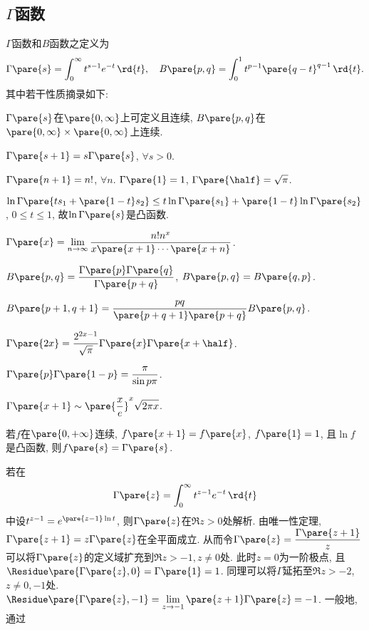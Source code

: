\documentclass{ctexart}
\begin{document}

\subsection{\texorpdfstring{$\Gamma$}{Gamma}函数} %
\label{sub:gamma函数}

$\Gamma$函数和$B$函数之定义为
\[ \Gamma\pare{s} = \int_0^\infty t^{s-1} e^{-t}\,\rd{t},\quad B\pare{p,q} = \int_0^1 t^{p-1} \pare{q-t}^{q-1}\,\rd{t}. \]
其中若干性质摘录如下:
\begin{cenum}
    \item $\Gamma\pare{s}$在$\pare{0,\infty}$上可定义且连续, $B\pare{p,q}$在$\pare{0,\infty}\times \pare{0,\infty}$上连续.
    \item $\Gamma\pare{s+1} = s\Gamma\pare{s}$, $\forall s>0$.
    \item $\Gamma\pare{n+1} = n!$, $\forall n$. $\Gamma\pare{1} = 1$, $\displaystyle \Gamma\pare{\half} = \sqrt{\pi}$.
    \item $\ln \Gamma\pare{ts_1 + \pare{1-t}s_2} \le t\ln \Gamma\pare{s_1} + \pare{1-t} \ln \Gamma\pare{s_2}$, $0\le t\le 1$, 故$\ln \Gamma\pare{s}$是凸函数.
    \item $\displaystyle \Gamma\pare{x} = \lim_{n\rightarrow\infty} \frac{n!n^x}{x\pare{x+1}\cdots \pare{x+n}}$.
    \item $\displaystyle B\pare{p,q} = \frac{\Gamma\pare{p}\Gamma\pare{q}}{\Gamma\pare{p+q}}$, $\displaystyle B\pare{p,q} = B\pare{q,p}$.
    \item $\displaystyle B\pare{p+1,q+1} = \frac{pq}{\pare{p+q+1}\pare{p+q}}B\pare{p,q}$.
    \item $\displaystyle \Gamma\pare{2x} = \frac{2^{2x-1}}{\sqrt{\pi}} \Gamma\pare{x} \Gamma\pare{x+\half}$.
    \item $\displaystyle \Gamma\pare{p} \Gamma\pare{1-p} = \frac{\pi}{\sin p\pi}$.
    \item $\displaystyle \Gamma\pare{x+1} \sim \displaystyle \pare{\frac{x}{e}}^x \sqrt{2\pi x}$.
\end{cenum}
\begin{remark}
    若$f$在$\pare{0,+\infty}$连续, $f\pare{x+1} = f\pare{x}$, $f\pare{1} = 1$, 且$\ln f$是凸函数, 则$f\pare{s} = \Gamma\pare{s}$.
\end{remark}
若在
\[ \Gamma\pare{z} = \int_0^\infty t^{z-1}e^{-t}\,\rd{t} \]
中设$t^{z-1} = e^{\pare{z-1}\ln t}$, 则$\Gamma\pare{z}$在$\Re z>0$处解析. 由唯一性定理, $\Gamma\pare{z+1} = z\Gamma\pare{z}$在全平面成立. 从而令$\displaystyle \Gamma\pare{z} = \frac{\Gamma\pare{z+1}}{z}$可以将$\Gamma\pare{z}$的定义域扩充到$\Re z>-1, z\neq 0$处. 此时$z=0$为一阶极点, 且$\Residue\pare{\Gamma\pare{z},0} = \Gamma\pare{1} = 1$. 同理可以将$\Gamma$延拓至$\Re z>-2$, $z\neq 0, -1$处. $\Residue \pare{\Gamma\pare{z},-1} = \displaystyle \lim_{z\rightarrow -1} \pare{z+1}\Gamma\pare{z} = -1$. 一般地, 通过
\end{document}
